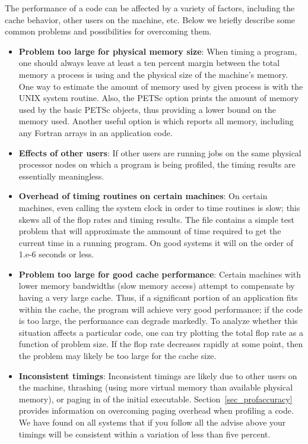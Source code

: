 {{The performance of a code can be affected by a variety of factors, 
including the cache behavior, other users on the machine, etc.
Below we briefly describe some common problems and possibilities for
overcoming them.

\begin{itemize}
\item {\bf Problem too large for physical memory size}: When timing a program, one
      should always leave at least a ten percent margin between the total
      memory a process is using and the physical size of 
      the machine's memory. One way to estimate the amount of 
      memory used by given process is with the UNIX  system routine.
      Also, the PETSc option  prints the amount of 
      memory used by the basic PETSc objects, thus providing a lower
      bound on the memory used.  Another useful option is 
      which reports all memory, including any Fortran arrays in an
      application code.
\item {\bf Effects of other users}:  If other users are running
      jobs on the same physical processor nodes on which a program is being profiled,
      the timing results are essentially meaningless. 
\item {\bf Overhead of timing routines on certain machines}: On certain machines,
      even calling the system clock in order to time routines is 
      slow; this skews all of the flop rates and timing results. The file
       contains a
      simple test problem that will approximate the ammount of time
      required to get the current time in a running program. On good
      systems it will on the order of 1.e-6 seconds or less.
\item {\bf Problem too large for good cache performance}: Certain machines
      with lower memory bandwidths (slow memory access) attempt to 
      compensate by having a very large cache.  Thus, if a significant
      portion of an application fits within the cache, the program will achieve very 
      good performance; if the code is too large, the performance can degrade markedly.
      To analyze whether this situation affects a particular code, one can
      try plotting the total flop rate as a function of problem
      size.  If the flop rate decreases rapidly at some point, then the
      problem may likely be too large for the cache size. 
\item {\bf Inconsistent timings}:  Inconsistent timings are likely due to other
      users on the machine, thrashing (using more virtual memory than available
      physical memory), or paging in of the initial executable.  
      Section~\ref{sec_profaccuracy} provides information on overcoming paging
      overhead when profiling a code. We have found on all systems that if you 
      follow all the advise above your timings will be consistent within a variation
      of less than five percent.
\end{itemize}

}}
